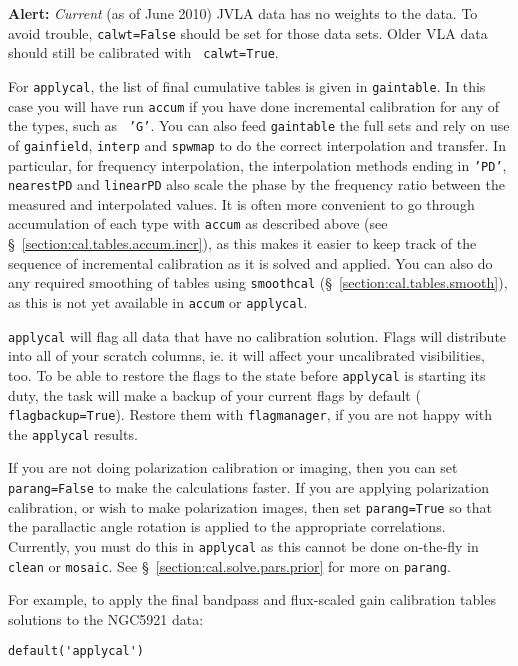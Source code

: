 {{\bf Alert:} {\it Current} (as of June 2010) JVLA data has no weights
to the data. To avoid trouble, {\tt calwt=False} should be set for
those data sets. Older VLA data should still be calibrated with {\tt
  calwt=True}.

For {\tt applycal}, the list of final cumulative tables is given in
{\tt gaintable}.  In this case you will have run {\tt accum} if you
have done incremental calibration for any of the types, such as {\tt
  'G'}.  You can also feed {\tt gaintable} the full sets and rely on
use of {\tt gainfield}, {\tt interp} and {\tt spwmap} to do the
correct interpolation and transfer.  In particular, for frequency
interpolation, the interpolation methods ending in {\tt 'PD'}, {\tt
  nearestPD} and {\tt linearPD} also scale the phase by the frequency
ratio between the measured and interpolated values. It is often more
convenient to go through accumulation of each type with {\tt accum} as
described above (see \S~\ref{section:cal.tables.accum.incr}), as this
makes it easier to keep track of the sequence of incremental
calibration as it is solved and applied.  You can also do any required
smoothing of tables using {\tt smoothcal}
(\S~\ref{section:cal.tables.smooth}), as this is not yet available in
{\tt accum} or {\tt applycal}.


{\tt applycal} will flag all data that have no calibration
solution. Flags will distribute into all of your scratch columns,
ie. it will affect your uncalibrated visibilities, too. To be able to
restore the flags to the state before {\tt applycal} is starting its
duty, the task will make a backup of your current flags by default ({\tt
  flagbackup=True}). Restore them with {\tt flagmanager}, if you are
not happy with the {\tt applycal} results.



If you are not doing polarization calibration or imaging, then you can set 
{\tt parang=False} to make the calculations faster.  If you are
applying polarization calibration, or wish to make polarization
images, then set {\tt parang=True} so that the parallactic angle
rotation is applied to the appropriate correlations.  Currently,
you must do this in {\tt applycal} as this cannot be done on-the-fly
in {\tt clean} or {\tt mosaic}.  
See \S~\ref{section:cal.solve.pars.prior} for more on {\tt parang}.


For example, to apply the final bandpass and flux-scaled gain
calibration tables solutions to the NGC5921 data:
\small
\begin{verbatim}
default('applycal')


\end{verbatim}}
